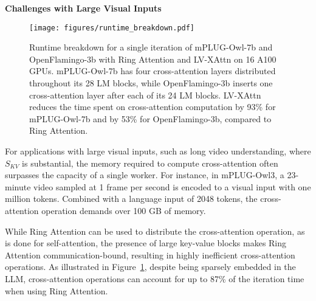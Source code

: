 \textbf{Challenges with Large Visual Inputs} 
\begin{figure}[t]
    \centering
    \texttt{[image: figures/runtime\_breakdown.pdf]}
    \caption{Runtime breakdown for a single iteration of mPLUG-Owl-7b and OpenFlamingo-3b with Ring Attention and LV-XAttn on 16 A100 GPUs. mPLUG-Owl-7b has four cross-attention layers distributed throughout its 28 LM blocks, while OpenFlamingo-3b inserts one cross-attention layer after each of its 24 LM blocks. LV-XAttn reduces the time spent on cross-attention computation by 93\% for mPLUG-Owl-7b and by 53\% for OpenFlamingo-3b, compared to Ring Attention.}
    \label{fig:runtime_breakdown}
\end{figure}
For applications with large visual inputs, such as long video understanding, where $S_{KV}$ is substantial, the memory required to compute cross-attention often surpasses the capacity of a single worker. For instance, in mPLUG-Owl3, a 23-minute video sampled at 1 frame per second is encoded to a visual input with one million tokens. Combined with a language input of 2048 tokens, the cross-attention operation demands over 100 GB of memory. 

While Ring Attention can be used to distribute the cross-attention operation, as is done for self-attention, the presence of large key-value blocks makes Ring Attention communication-bound, resulting in highly inefficient cross-attention operations. As illustrated in Figure~\ref{fig:runtime_breakdown}, despite being sparsely embedded in the LLM, cross-attention operations can account for up to 87\% of the iteration time when using Ring Attention.

